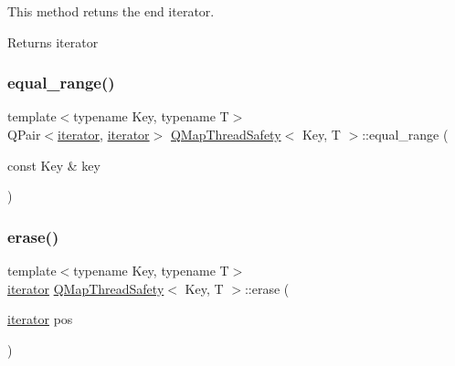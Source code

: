 This method retuns the end iterator. 

\begin{DoxyReturn}{Returns}
iterator 
\end{DoxyReturn}
\mbox{\label{class_q_map_thread_safety_aea999f181f31f0ac6bd01bcc016a673c}} 
\subsubsection{\texorpdfstring{equal\+\_\+range()}{equal\_range()}}
{\footnotesize\ttfamily template$<$typename Key, typename T$>$ \\
Q\+Pair$<$\hyperlink{class_q_map_thread_safety_a454c8af3f68e6d61aecaf1b918aa525b}{iterator}, \hyperlink{class_q_map_thread_safety_a454c8af3f68e6d61aecaf1b918aa525b}{iterator}$>$ \hyperlink{class_q_map_thread_safety}{Q\+Map\+Thread\+Safety}$<$ Key, T $>$\+::equal\+\_\+range (\begin{DoxyParamCaption}\item[{const Key \&}]{key }\end{DoxyParamCaption})\hspace{0.3cm}{\ttfamily [inline]}}

\mbox{\label{class_q_map_thread_safety_a11c11617434ce781961ee8f722208d0e}} 
\subsubsection{\texorpdfstring{erase()}{erase()}}
{\footnotesize\ttfamily template$<$typename Key, typename T$>$ \\
\hyperlink{class_q_map_thread_safety_a454c8af3f68e6d61aecaf1b918aa525b}{iterator} \hyperlink{class_q_map_thread_safety}{Q\+Map\+Thread\+Safety}$<$ Key, T $>$\+::erase (\begin{DoxyParamCaption}\item[{\hyperlink{class_q_map_thread_safety_a454c8af3f68e6d61aecaf1b918aa525b}{iterator}}]{pos }\end{DoxyParamCaption})\hspace{0.3cm}{\ttfamily [inline]}}


